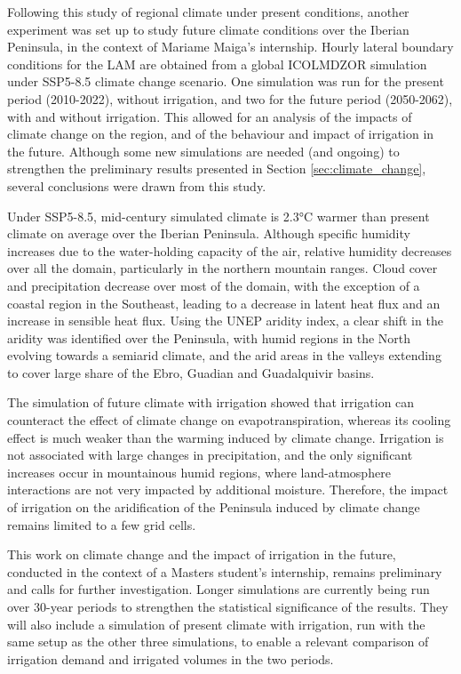 \hfill

Following this study of regional climate under present conditions, another experiment was set up to study future climate conditions over the Iberian Peninsula, in the context of Mariame Maiga's internship.
Hourly lateral boundary conditions for the LAM are obtained from a global ICOLMDZOR simulation under SSP5-8.5 climate change scenario. 
One simulation was run for the present period (2010-2022), without irrigation, and two for the future period (2050-2062), with and without irrigation. This allowed for an analysis of the impacts of climate change on the region, and of the behaviour and impact of irrigation in the future. 
Although some new simulations are needed (and ongoing) to strengthen the preliminary results presented in Section \ref{sec:climate_change}, several conclusions were drawn from this study. 

Under SSP5-8.5, mid-century simulated climate is 2.3°C warmer than present climate on average over the Iberian Peninsula. Although specific humidity increases due to the water-holding capacity of the air, relative humidity decreases over all the domain, particularly in the northern mountain ranges. Cloud cover and precipitation decrease over most of the domain, with the exception of a coastal region in the Southeast, leading to a decrease in latent heat flux and an increase in sensible heat flux. Using the UNEP aridity index, a clear shift in the aridity was identified over the Peninsula, with humid regions in the North evolving towards a semiarid climate, and the arid areas in the valleys extending to cover large share of the Ebro, Guadian and Guadalquivir basins.

The simulation of future climate with irrigation showed that irrigation can counteract the effect of climate change on evapotranspiration, whereas its cooling effect is much weaker than the warming induced by climate change. Irrigation is not associated with large changes in precipitation, and the only significant increases occur in mountainous humid regions, where land-atmosphere interactions are not very impacted by additional moisture. Therefore, the impact of irrigation on the aridification of the Peninsula induced by climate change remains limited to a few grid cells.

This work on climate change and the impact of irrigation in the future, conducted in the context of a Masters student's internship, remains preliminary and calls for further investigation. Longer simulations are currently being run over 30-year periods to strengthen the statistical significance of the results. They will also include a simulation of present climate with irrigation, run with the same setup as the other three simulations, to enable a relevant comparison of irrigation demand and irrigated volumes in the two periods.

\clearpage
